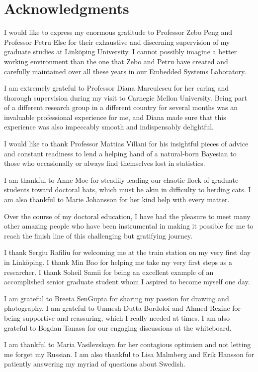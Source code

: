 \chapter*{Acknowledgments}

I would like to express my enormous gratitude to Professor Zebo Peng and
Professor Petru Else for their exhaustive and discerning supervision of my
graduate studies at Linköping University. I cannot possibly imagine a better
working environment than the one that Zebo and Petru have created and carefully
maintained over all these years in our Embedded Systems Laboratory.

I am extremely grateful to Professor Diana Marculescu for her caring and
thorough supervision during my visit to Carnegie Mellon University. Being part
of a different research group in a different country for several months was an
invaluable professional experience for me, and Diana made sure that this
experience was also impeccably smooth and indispensably delightful.

I would like to thank Professor Mattias Villani for his insightful pieces of
advice and constant readiness to lend a helping hand of a natural-born Bayesian
to those who occasionally or always find themselves lost in statistics.

I am thankful to Anne Moe for steadily leading our chaotic flock of graduate
students toward doctoral hats, which must be akin in difficulty to herding cats.
I am also thankful to Marie Johansson for her kind help with every matter.

Over the course of my doctoral education, I have had the pleasure to meet many
other amazing people who have been instrumental in making it possible for me to
reach the finish line of this challenging but gratifying journey.

I thank Sergiu Rafiliu for welcoming me at the train station on my very first
day in Linköping. I thank Min Bao for helping me take my very first steps as a
researcher. I thank Soheil Samii for being an excellent example of an
accomplished senior graduate student whom I aspired to become myself one day.

I am grateful to Breeta SenGupta for sharing my passion for drawing and
photography. I am grateful to Unmesh Dutta Bordoloi and Ahmed Rezine for being
supportive and reassuring, which I really needed at times. I am also grateful to
Bogdan Tanasa for our engaging discussions at the whiteboard.

I am thankful to Maria Vasilevskaya for her contagious optimism and not letting
me forget my Russian. I am also thankful to Lisa Malmberg and Erik Hansson for
patiently answering my myriad of questions about Swedish.

